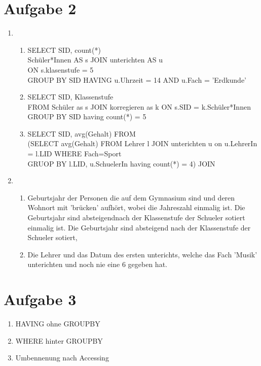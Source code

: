 \documentclass[12pt]{article}
\begin{document}
    \section*{Aufgabe 2}
    \begin{enumerate}[label=(\alph*)]
        \item \begin{enumerate}[label=(\roman*)]
        \item SELECT SID, count(*)\\
        Schüler*Innen AS s JOIN unterichten AS u 
        \\ON s.klasenstufe = 5 \\
        GROUP BY SID 
        HAVING u.Uhrzeit = 14 AND u.Fach = 'Erdkunde'
        \item SELECT SID, Klassenstufe \\
        FROM Schüler as s JOIN korregieren as k ON s.SID = k.Schüler*Innen
        GROUP BY SID having count(*) = 5
        \item SELECT SID, avg(Gehalt) FROM \\
        (SELECT avg(Gehalt) FROM Lehrer l JOIN unterichten u on u.LehrerIn = l.LID WHERE Fach=Sport 
        \\GRUOP BY l.LID, u.SchuelerIn having count(*) = 4)
        JOIN  
        \end{enumerate}
        \item \begin{enumerate}[label=(\roman*)]
            \item Geburtsjahr der Personen die auf dem Gymnasium sind und deren Wohnort mit 'brücken' aufhört, 
            wobei die Jahreszahl einmalig ist. Die Geburtsjahr sind absteigendnach der Klassenstufe der Schueler sotiert einmalig ist. Die Geburtsjahr sind absteigend 
            nach der Klassenstufe der Schueler sotiert,
            \item Die Lehrer und das Datum des ersten unterichts, 
            welche das Fach 'Musik' unterichten und noch nie eine 6 gegeben hat.
        \end{enumerate}

    \end{enumerate}
    \section*{Aufgabe 3}
    \begin{enumerate}
        \item HAVING ohne GROUPBY
        \item WHERE hinter GROUPBY
        \item Umbennenung nach Accessing 
    \end{enumerate}
\end{document}
